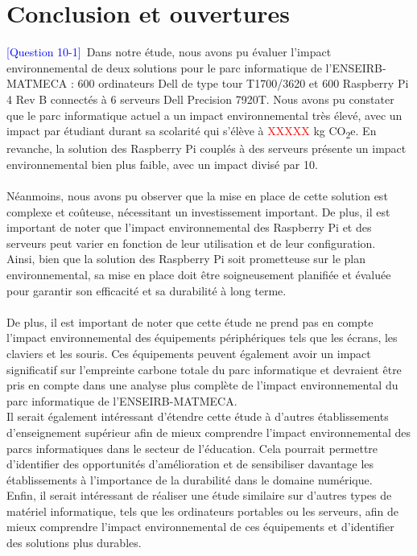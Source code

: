 \documentclass[12pt,a4paper]{paper}
\begin{document}
\section{Conclusion et ouvertures}
\textcolor{blue}{[Question 10-1]}~Dans notre étude, nous avons pu évaluer l'impact environnemental de deux solutions pour le parc informatique de l'ENSEIRB-MATMECA : 600 ordinateurs Dell de type tour T1700/3620 et 600 Raspberry Pi 4 Rev B connectés à 6 serveurs Dell Precision 7920T. Nous avons pu constater que le parc informatique actuel a un impact environnemental très élevé, avec un impact par étudiant durant sa scolarité qui s'élève à \textcolor{red}{XXXXX} kg CO\textsubscript{2}e. En revanche, la solution des Raspberry Pi couplés à des serveurs présente un impact environnemental bien plus faible, avec un impact divisé par 10.\\ \\
Néanmoins, nous avons pu observer que la mise en place de cette solution est complexe et coûteuse, nécessitant un investissement important. De plus, il est important de noter que l'impact environnemental des Raspberry Pi et des serveurs peut varier en fonction de leur utilisation et de leur configuration.\\
Ainsi, bien que la solution des Raspberry Pi soit prometteuse sur le plan environnemental, sa mise en place doit être soigneusement planifiée et évaluée pour garantir son efficacité et sa durabilité à long terme.\\ \\
De plus, il est important de noter que cette étude ne prend pas en compte l'impact environnemental des équipements périphériques tels que les écrans, les claviers et les souris. Ces équipements peuvent également avoir un impact significatif sur l'empreinte carbone totale du parc informatique et devraient être pris en compte dans une analyse plus complète de l'impact environnemental du parc informatique de l'ENSEIRB-MATMECA.\\
Il serait également intéressant d'étendre cette étude à d'autres établissements d'enseignement supérieur afin de mieux comprendre l'impact environnemental des parcs informatiques dans le secteur de l'éducation. Cela pourrait permettre d'identifier des opportunités d'amélioration et de sensibiliser davantage les établissements à l'importance de la durabilité dans le domaine numérique.\\
Enfin, il serait intéressant de réaliser une étude similaire sur d'autres types de matériel informatique, tels que les ordinateurs portables ou les serveurs, afin de mieux comprendre l'impact environnemental de ces équipements et d'identifier des solutions plus durables.

\printbibliography
{}
% 

\appendix
\end{document}
